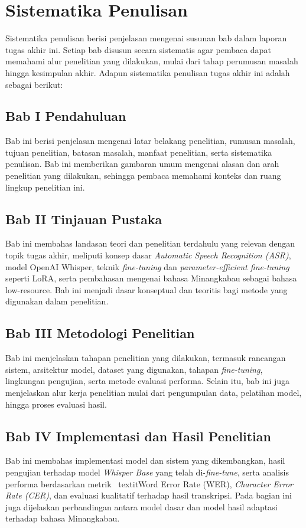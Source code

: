 \section{Sistematika Penulisan} \label{I.Sistematika}
Sistematika penulisan berisi penjelasan mengenai susunan bab dalam laporan tugas akhir ini. Setiap bab disusun secara sistematis agar pembaca dapat memahami alur penelitian yang dilakukan, mulai dari tahap perumusan masalah hingga kesimpulan akhir. Adapun sistematika penulisan tugas akhir ini adalah sebagai berikut:

\subsection*{Bab I Pendahuluan}
Bab ini berisi penjelasan mengenai latar belakang penelitian, rumusan masalah, tujuan penelitian, batasan masalah, manfaat penelitian, serta sistematika penulisan. Bab ini memberikan gambaran umum mengenai alasan dan arah penelitian yang dilakukan, sehingga pembaca memahami konteks dan ruang lingkup penelitian ini.

\subsection*{Bab II Tinjauan Pustaka}
Bab ini membahas landasan teori dan penelitian terdahulu yang relevan dengan topik tugas akhir, meliputi konsep dasar \textit{Automatic Speech Recognition (ASR)}, model OpenAI Whisper, teknik \textit{fine-tuning} dan \textit{parameter-efficient fine-tuning} seperti LoRA, serta pembahasan mengenai bahasa Minangkabau sebagai bahasa low-resource. Bab ini menjadi dasar konseptual dan teoritis bagi metode yang digunakan dalam penelitian.

\subsection*{Bab III Metodologi Penelitian}
Bab ini menjelaskan tahapan penelitian yang dilakukan, termasuk rancangan sistem, arsitektur model, dataset yang digunakan, tahapan \textit{fine-tuning}, lingkungan pengujian, serta metode evaluasi performa. Selain itu, bab ini juga menjelaskan alur kerja penelitian mulai dari pengumpulan data, pelatihan model, hingga proses evaluasi hasil.

\subsection*{Bab IV Implementasi dan Hasil Penelitian}
Bab ini membahas implementasi model dan sistem yang dikembangkan, hasil pengujian terhadap model \textit{Whisper Base} yang telah di-\textit{fine-tune}, serta analisis performa berdasarkan metrik \ textit{Word Error Rate (WER)}, \textit{Character Error Rate (CER)}, dan evaluasi kualitatif terhadap hasil transkripsi. Pada bagian ini juga dijelaskan perbandingan antara model dasar dan model hasil adaptasi terhadap bahasa Minangkabau.


